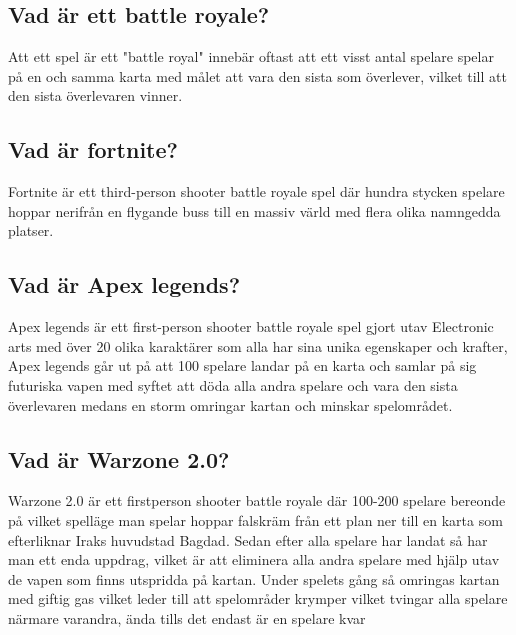 \documentclass[11p]{article}
\begin{document}
\n

\subsection{Vad är ett battle royale?}
Att ett spel är ett "battle royal" innebär oftast att ett visst antal spelare spelar på en och samma karta med målet att vara den sista som överlever, vilket till att den sista överlevaren vinner.

\subsection{Vad är fortnite?}
Fortnite är ett third-person shooter battle royale spel där hundra stycken spelare hoppar nerifrån en flygande buss till en massiv värld med flera olika namngedda platser. \parencite{Fornite}

\subsection{Vad är Apex legends?}
Apex legends är ett first-person shooter battle royale spel gjort utav Electronic arts med över 20 olika karaktärer som alla har sina unika egenskaper och krafter, Apex legends går ut på att 100 spelare landar på en karta och samlar på sig futuriska vapen med syftet att döda alla andra spelare och vara den sista överlevaren medans en storm omringar kartan och minskar spelområdet.     \parencite{Apex}

\subsection{Vad är Warzone 2.0?}
Warzone 2.0 är ett firstperson shooter battle royale där 100-200 spelare bereonde på vilket spelläge man spelar hoppar falskräm från ett plan ner till en karta som efterliknar Iraks huvudstad Bagdad. Sedan efter alla spelare har landat så har man ett enda uppdrag, vilket är att eliminera alla andra spelare med hjälp utav de vapen som finns utspridda på kartan. Under spelets gång så omringas kartan med giftig gas vilket leder till att spelområder krymper vilket tvingar alla spelare närmare varandra, ända tills det endast är en spelare kvar \parencite{Warzone2.0}



\printbibliography
\end{document}
